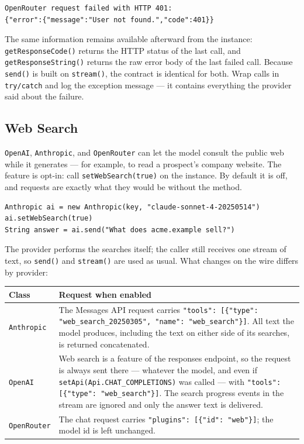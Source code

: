 \begin{lstlisting}[language={}]
OpenRouter request failed with HTTP 401:
{"error":{"message":"User not found.","code":401}}
\end{lstlisting}

\noindent
The same information remains available afterward from the instance: \texttt{getResponseCode()} returns the HTTP status of the last call, and \texttt{getResponseString()} returns the raw error body of the last failed call.  Because \texttt{send()} is built on \texttt{stream()}, the contract is identical for both.  Wrap calls in \texttt{try/catch} and log the exception message --- it contains everything the provider said about the failure.

\subsection{Web Search}
\label{sec:llm-websearch}

\texttt{OpenAI}, \texttt{Anthropic}, and \texttt{OpenRouter} can let the model consult the public web while it generates --- for example, to read a prospect's company website.  The feature is opt-in: call \texttt{setWebSearch(true)} on the instance.  By default it is off, and requests are exactly what they would be without the method.

\begin{lstlisting}[style=groovy]
Anthropic ai = new Anthropic(key, "claude-sonnet-4-20250514")
ai.setWebSearch(true)
String answer = ai.send("What does acme.example sell?")
\end{lstlisting}

\noindent
The provider performs the searches itself; the caller still receives one stream of text, so \texttt{send()} and \texttt{stream()} are used as usual.  What changes on the wire differs by provider:

\begin{longtable}{P{2.4cm}P{8.1cm}}
\toprule
\textbf{Class} & \textbf{Request when enabled} \\
\midrule
\endhead
\texttt{Anthropic} & The Messages API request carries \texttt{"tools": [\{"type": "web\_search\_20250305", "name": "web\_search"\}]}.  All text the model produces, including the text on either side of its searches, is returned concatenated. \\
\texttt{OpenAI} & Web search is a feature of the responses endpoint, so the request is always sent there --- whatever the model, and even if \texttt{setApi(Api.CHAT\_COMPLETIONS)} was called --- with \texttt{"tools": [\{"type": "web\_search"\}]}.  The search progress events in the stream are ignored and only the answer text is delivered. \\
\texttt{OpenRouter} & The chat request carries \texttt{"plugins": [\{"id": "web"\}]}; the model id is left unchanged. \\
\bottomrule
\end{longtable}

